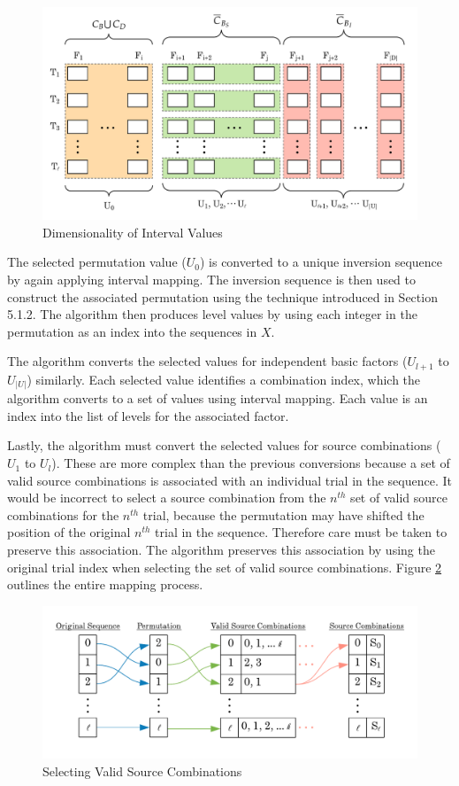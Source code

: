 \begin{figure}[t]
\centering
\centerline{\includegraphics[origin=c,width=12cm]{../figures/sequence-dimensions.png}}
\caption{Dimensionality of Interval Values}
\label{fig:sequence_dimensions}
\end{figure}

The selected permutation value ($U_0$) is converted to a unique inversion sequence by again applying interval mapping. The inversion sequence is then used to construct the associated permutation using the technique introduced in Section 5.1.2. The algorithm then produces level values by using each integer in the permutation as an index into the sequences in $X$.

The algorithm converts the selected values for independent basic factors ($U_{l+1}$ to $U_{|U|}$) similarly. Each selected value identifies a combination index, which the algorithm converts to a set of values using interval mapping. Each value is an index into the list of levels for the associated factor. %

Lastly, the algorithm must convert the selected values for source combinations ($U_1$ to $U_l$). These are more complex than the previous conversions because a set of valid source combinations is associated with an individual trial in the sequence. It would be incorrect to select a source combination from the $n^{th}$ set of valid source combinations for the $n^{th}$ trial, because the permutation may have shifted the position of the original $n^{th}$ trial in the sequence. Therefore care must be taken to preserve this association. The algorithm preserves this association by using the original trial index when selecting the set of valid source combinations. Figure \ref{fig:source_combinations} outlines the entire mapping process.


\begin{figure}[t]
\centering
\centerline{\includegraphics[origin=c,width=12cm]{../figures/source-combination-mapping.png}}
\caption{Selecting Valid Source Combinations}
\label{fig:source_combinations}
\end{figure}

